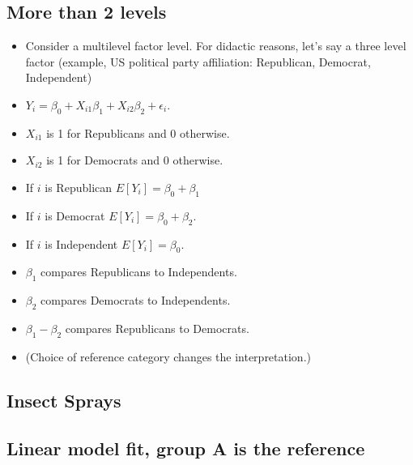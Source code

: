\documentclass[12pt,openright,oneside,a4paper,chapter=TITLE,section=TITLE,subsection=Title,english,french,spanish,portugues,sumario=tradicional]{04-class-files/abntex2}
\newenvironment{Shaded}{\begin{snugshade}}{\end{snugshade}}
\newcommand{\DataTypeTok}[1]{\textcolor[rgb]{0.13,0.29,0.53}{#1}}
\newcommand{\KeywordTok}[1]{\textcolor[rgb]{0.13,0.29,0.53}{\textbf{#1}}}
\newcommand{\NormalTok}[1]{#1}
\newcommand{\OperatorTok}[1]{\textcolor[rgb]{0.81,0.36,0.00}{\textbf{#1}}}
\newcommand{\StringTok}[1]{\textcolor[rgb]{0.31,0.60,0.02}{#1}}
\providecommand{\tightlist}{%
  \setlength{\itemsep}{0pt}\setlength{\parskip}{0pt}}
\begin{document}
\hypertarget{more-than-2-levels}{%
\subsection{More than 2 levels}\label{more-than-2-levels}}

\begin{itemize}
\tightlist
\item
  Consider a multilevel factor level. For didactic reasons, let's say a three level factor (example, US political party affiliation: Republican, Democrat, Independent)
\item
  \(Y_i = \beta_0 + X_{i1} \beta_1 + X_{i2} \beta_2 + \epsilon_i\).
\item
  \(X_{i1}\) is 1 for Republicans and 0 otherwise.
\item
  \(X_{i2}\) is 1 for Democrats and 0 otherwise.
\item
  If \(i\) is Republican \(E[Y_i] = \beta_0 +\beta_1\)
\item
  If \(i\) is Democrat \(E[Y_i] = \beta_0 + \beta_2\).
\item
  If \(i\) is Independent \(E[Y_i] = \beta_0\).
\item
  \(\beta_1\) compares Republicans to Independents.
\item
  \(\beta_2\) compares Democrats to Independents.
\item
  \(\beta_1 - \beta_2\) compares Republicans to Democrats.
\item
  (Choice of reference category changes the interpretation.)
\end{itemize}

\hypertarget{insect-sprays}{%
\subsection{Insect Sprays}\label{insect-sprays}}

\hypertarget{linear-model-fit-group-a-is-the-reference}{%
\subsection{Linear model fit, group A is the reference}\label{linear-model-fit-group-a-is-the-reference}}

\begin{Shaded}
\end{Shaded}
\end{document}
